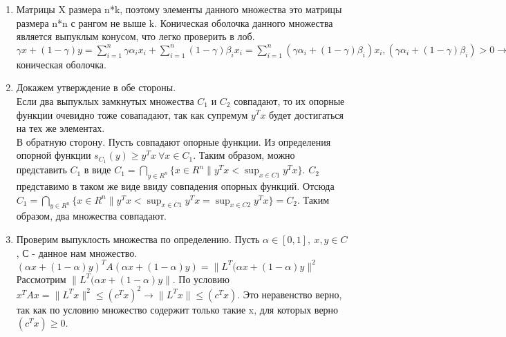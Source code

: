 \documentclass[12pt]{extreport}
\theoremstyle{definiton}
\theoremstyle{definition}
\theoremstyle{definition}
\let\leq\leqslant
\let\geq\geqslant
\begin{document}
\begin{enumerate}
        \\ Заметим, что $y^TAx+x^TAy = (x+y)^TA(x+y) - x^TAx - y^TAy$. И еще, из условия на множества, имеем $b^Tx \leq -x^TAx - c\ \forall x \in C$.
        \\ Таким образом: $y^TAx+x^TAy+b^Tx+b^Ty+2*c \leq (x+y)^TA(x+y) - x^TAx - y^TAy - x^TAx - c - y^TAy - c + 2c = (x+y)^TA(x+y) - 2x^TAx - 2y^TAy$. По условию $A\succ0$, значит матрица может быть представлена в виде $A=L^TL$. Распишем оставшееся выражения через нормы:
        \\ $(x+y)^TA(x+y) - 2x^TAx - 2y^TAy = \|L^T(x+y)\|^2 - 2\|L^Tx\|^2 - 2\|L^Ty\|^2 \leq (\|L^Tx\|+\|L^Ty\|)^2 - 2\|L^Tx\|^2 - 2\|L^Ty\|^2 = -(\|L^Tx\| - \|L^Ty\|)^2 \leq 0$
        \\Таким образом наше изначальное выражение меньше или равно нуля и выполнилось $\alpha x + (1-\alpha)y \in C$ для любых элементов из С. Таким образом, множество С выпукло.
        \item Матрицы X размера n*k, поэтому элементы данного множества это матрицы размера n*n с рангом не выше k. Коническая оболочка данного множества является выпуклым конусом, что легко проверить в лоб. $\gamma x + (1-\gamma)y = \sum_{i=1}^{n}\gamma\alpha_i x_i + \sum_{i=1}^{n}(1-\gamma)\beta_i x_i = \sum_{i=1}^{n} (\gamma\alpha_i + (1-\gamma)\beta_i)x_i, (\gamma\alpha_i + (1-\gamma)\beta_i) > 0 \to \gamma x + (1-\gamma)y \in$ коническая оболочка.
        \item Докажем утверждение в обе стороны.
        \\ Если два выпуклых замкнутых множества $C_1$ и $C_2$ совпадают, то их опорные функции очевидно тоже совападают, так как супремум $y^Tx$ будет достигаться на тех же элементах.
        \\ В обратную сторону. Пусть совпадают опорные функции. Из определения опорной функции $s_{C_1}(y) \geq y^Tx\ \forall x \in C_1$. Таким образом, можно представить $C_1$ в виде $C_1 = \bigcap\limits_{y\in R^n}\{x \in R^n \| y^Tx < \sup_{x\in C1}y^Tx\}$. $C_2$ представимо в таком же виде ввиду совпадения опорных функций. Отсюда $C_1 = \bigcap\limits_{y\in R^n}\{x \in R^n \| y^Tx < \sup_{x\in C1}y^Tx = \sup_{x\in C2}y^Tx\}=C_2$. Таким образом, два множества совпадают.
        \item Проверим выпуклость множества по определению. Пусть $\alpha \in [0,1],\ x,y\in C$, С - данное нам множество. 
        \\$(\alpha x + (1-\alpha)y)^TA(\alpha x + (1-\alpha)y) = \|L^T(\alpha x + (1-\alpha)y\|^2$
        \\Рассмотрим $\|L^T(\alpha x + (1-\alpha)y\|$. По условию $x^TAx = \|L^Tx\|^2  \leq (c^Tx)^2 \to \|L^Tx\| \leq (c^Tx)$. Это неравенство верно, так как по условию множество содержит только такие x, для которых верно $(c^Tx) \geq 0$.

\end{enumerate}
\end{document}
